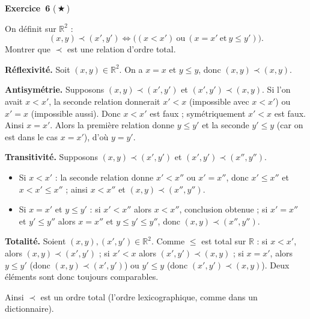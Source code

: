 \documentclass[11pt,a4paper]{article}
\newcommand{\R}{\mathbb{R}}\newcommand{\N}{\mathbb{N}}\newcommand{\Z}{\mathbb{Z}}
\begin{document}
	\medskip\noindent\textbf{\Large\color{bleu}Exercice~6} \textnormal{(\,$\bigstar$\,)}\nopagebreak
	\begin{enonce}
		On définit sur $\mathbb{R}^2$ :
		\[
		(x,y)\prec(x',y')\iff\bigl((x<x')\ \text{ou}\ (x=x'\ \text{et}\ y\leq y')\bigr).
		\]
		Montrer que $\prec$ est une relation d’ordre total.
	\end{enonce}
	\begin{corrige}
		\textbf{Réflexivité.} Soit $(x,y)\in\R^2$. On a $x=x$ et $y\leq y$, donc $(x,y)\prec(x,y)$.
		
		\textbf{Antisymétrie.} Supposons $(x,y)\prec(x',y')$ et $(x',y')\prec(x,y)$. Si l'on avait $x<x'$, la seconde relation donnerait $x'<x$ (impossible avec $x<x'$) ou $x'=x$ (impossible aussi). Donc $x<x'$ est faux ; symétriquement $x'<x$ est faux. Ainsi $x=x'$. Alors la première relation donne $y\leq y'$ et la seconde $y'\leq y$ (car on est dans le cas $x=x'$), d'où $y=y'$.
		
		\textbf{Transitivité.} Supposons $(x,y)\prec(x',y')$ et $(x',y')\prec(x'',y'')$.
		\begin{itemize}
			\item Si $x<x'$ : la seconde relation donne $x'<x''$ ou $x'=x''$, donc $x'\leq x''$ et $x<x'\leq x''$ ; ainsi $x<x''$ et $(x,y)\prec(x'',y'')$.
			\item Si $x=x'$ et $y\leq y'$ : si $x'<x''$ alors $x<x''$, conclusion obtenue ; si $x'=x''$ et $y'\leq y''$ alors $x=x''$ et $y\leq y'\leq y''$, donc $(x,y)\prec(x'',y'')$.
		\end{itemize}
		
		\textbf{Totalité.} Soient $(x,y),(x',y')\in\R^2$. Comme $\leq$ est total sur $\R$ : si $x<x'$, alors $(x,y)\prec(x',y')$ ; si $x'<x$ alors $(x',y')\prec(x,y)$ ; si $x=x'$, alors $y\leq y'$ (donc $(x,y)\prec(x',y')$) ou $y'\leq y$ (donc $(x',y')\prec(x,y)$). Deux éléments sont donc toujours comparables.
		
		Ainsi $\prec$ est un ordre total (l'ordre lexicographique, comme dans un dictionnaire).
	\end{corrige}
	
\end{document}
